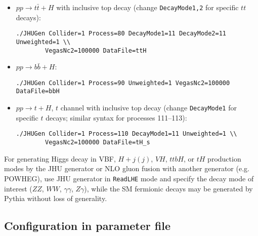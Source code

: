 \documentclass[aps,superscriptaddress,nofootinbib]{revtex4}
\begin{document}
\begin{itemize}
\begin{verbatim}
\end{verbatim}
\item $pp \to t\bar{t}+H$ with inclusive top decay (change \verb|DecayMode1,2| for specific $tt$ decays):
\begin{verbatim}
./JHUGen Collider=1 Process=80 DecayMode1=11 DecayMode2=11 Unweighted=1 \\
		VegasNc2=100000 DataFile=ttH
\end{verbatim}
\item $pp \to b\bar{b}+H$:
\begin{verbatim}
./JHUGen Collider=1 Process=90 Unweighted=1 VegasNc2=100000 DataFile=bbH
\end{verbatim}
\item $pp \to t+H$, $t$ channel with inclusive top decay (change \verb|DecayMode1| for specific $t$ decays; similar syntax for processes 111--113):
\begin{verbatim}
./JHUGen Collider=1 Process=110 DecayMode1=11 Unweighted=1 \\
		VegasNc2=100000 DataFile=tH_s
\end{verbatim}
\end{itemize}


\noindent
For generating Higgs decay in VBF, $H+j(j)$, $VH$, $ttbH$, or $tH$ production
modes by the JHU generator or NLO gluon fusion with another generator (e.g. POWHEG), use JHU generator in \verb|ReadLHE|
mode and specify the decay mode of interest ($ZZ$, $WW$, $\gamma\gamma$, $Z\gamma$), while the SM fermionic decays
may be generated by Pythia without loss of generality.

\subsection{ Configuration in parameter file  }
\end{document}

